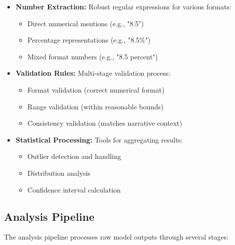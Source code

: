 \begin{itemize}
    \item \textbf{Number Extraction:} Robust regular expressions for various formats:
    \begin{itemize}
        \item Direct numerical mentions (e.g., "8.5")
        \item Percentage representations (e.g., "8.5\%")
        \item Mixed format numbers (e.g., "8.5 percent")
    \end{itemize}
    
    \item \textbf{Validation Rules:} Multi-stage validation process:
    \begin{itemize}
        \item Format validation (correct numerical format)
        \item Range validation (within reasonable bounds)
        \item Consistency validation (matches narrative context)
    \end{itemize}
    
    \item \textbf{Statistical Processing:} Tools for aggregating results:
    \begin{itemize}
        \item Outlier detection and handling
        \item Distribution analysis
        \item Confidence interval calculation
    \end{itemize}
\end{itemize}

\subsection{Analysis Pipeline}

The analysis pipeline processes raw model outputs through several stages:

